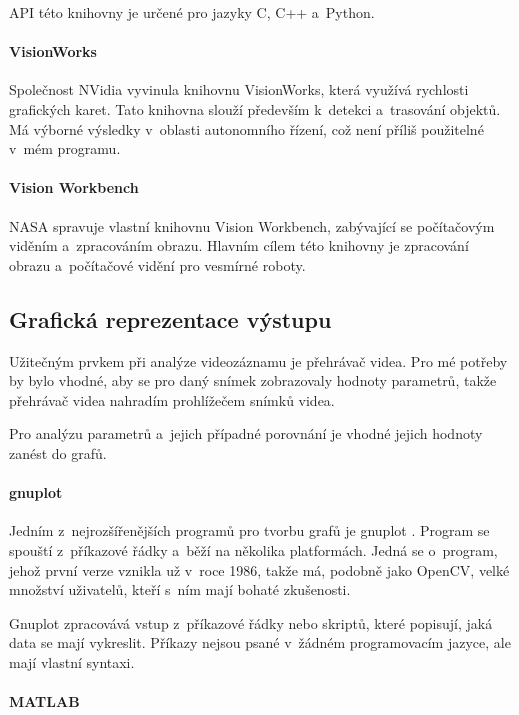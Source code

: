 API této knihovny je určené pro jazyky C, C++ a~Python.

\paragraph{VisionWorks}

Společnost NVidia vyvinula knihovnu VisionWorks, která využívá rychlosti grafických karet. Tato knihovna slouží především k~detekci a~trasování objektů. Má výborné výsledky v~oblasti autonomního řízení, což není příliš použitelné v~mém programu.

\paragraph{Vision Workbench}

NASA spravuje vlastní knihovnu Vision Workbench, zabývající se počítačovým viděním a~zpracováním obrazu. Hlavním cílem této knihovny je zpracování obrazu a~počítačové vidění pro vesmírné roboty.



\subsection{Grafická reprezentace výstupu}

Užitečným prvkem při analýze videozáznamu je přehrávač videa. Pro mé potřeby by bylo vhodné, aby se pro daný snímek zobrazovaly hodnoty parametrů, takže přehrávač videa nahradím prohlížečem snímků videa.

Pro analýzu parametrů a~jejich případné porovnání je vhodné jejich hodnoty zanést do grafů.

\paragraph{gnuplot}

Jedním z~nejrozšířenějších programů pro tvorbu grafů je gnuplot \citep{gnuplot}. Program se spouští z~příkazové řádky a~běží na několika platformách. Jedná se o~program, jehož první verze vznikla už v~roce 1986, takže má, podobně jako OpenCV, velké množství uživatelů, kteří s~ním mají bohaté zkušenosti.

Gnuplot zpracovává vstup z~příkazové řádky nebo skriptů, které popisují, jaká data se mají vykreslit. Příkazy nejsou psané v~žádném programovacím jazyce, ale mají vlastní syntaxi.

\paragraph{MATLAB}

